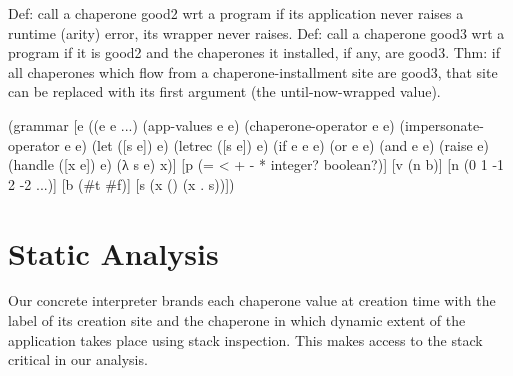 \documentclass{sigplanconf}
\begin{document}

Def: call a chaperone good2 wrt a program if its application never raises a runtime (arity) error, its wrapper never raises.
Def: call a chaperone good3 wrt a program if it is good2 and the chaperones it installed, if any, are good3.
Thm: if all chaperones which flow from a chaperone-installment site are good3, that site can be replaced with its first argument (the until-now-wrapped value).





\begin{schemedisplay}
(grammar
  [e ((e e ...)
      (app-values e e)
      (chaperone-operator e e)
      (impersonate-operator e e)
      (let ([s e]) e)
      (letrec ([s e]) e)
      (if e e e)
      (or e e)
      (and e e)
      (raise e)
      (handle ([x e]) e)
      (λ s e)
      x)]
  [p (= < + - * integer? boolean?)]
  [v (n b)]
  [n (0 1 -1 2 -2 ...)]
  [b (#t #f)]
  [s (x () (x . s))])
\end{schemedisplay}



\section{Static Analysis}

Our concrete interpreter brands each chaperone value at creation time with the label of its creation site and the chaperone in which dynamic extent of the application takes place using stack inspection. This makes access to the stack critical in our analysis.
\end{document}

